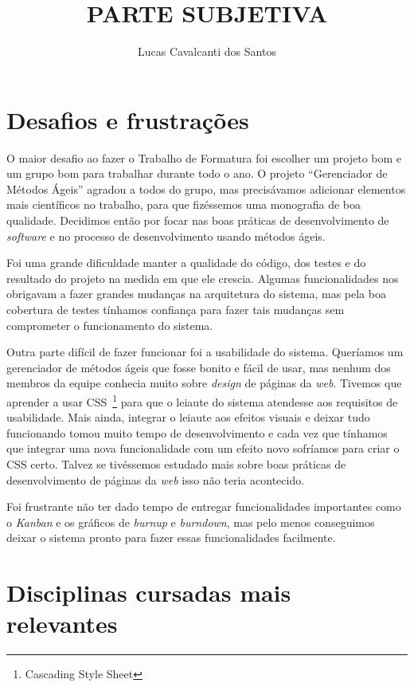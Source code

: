 \documentclass[titlepage,a4paper]{article}
\title{PARTE SUBJETIVA}
\author{Lucas Cavalcanti dos Santos}
\newcommand{\software}{\textit{software}}
\begin{document}
\maketitle



\section{Desafios e frustrações}

O maior desafio ao fazer o Trabalho de Formatura foi escolher um projeto bom e um grupo bom para trabalhar durante todo o ano. O projeto ``Gerenciador de Métodos Ágeis'' agradou a todos do grupo, mas precisávamos adicionar elementos mais científicos no trabalho, para que fizéssemos uma monografia de boa qualidade. Decidimos então por focar nas boas práticas de desenvolvimento de \software{} e no processo de desenvolvimento usando métodos ágeis.

Foi uma grande dificuldade manter a qualidade do código, dos testes e do resultado do projeto na medida em que ele crescia. Algumas funcionalidades nos obrigavam a fazer grandes mudanças na arquitetura do sistema, mas pela boa cobertura de testes tínhamos confiança para fazer tais mudanças sem comprometer o funcionamento do sistema.

Outra parte difícil de fazer funcionar foi a usabilidade do sistema. Queríamos um gerenciador de métodos ágeis que fosse bonito e fácil de usar, mas nenhum dos membros da equipe conhecia muito sobre \textit{design} de páginas da \textit{web}. Tivemos que aprender a usar CSS~\footnote{Cascading Style Sheet} para que o leiaute do sistema atendesse aos requisitos de usabilidade. Mais ainda, integrar o leiaute aos efeitos visuais e deixar tudo funcionando tomou muito tempo de desenvolvimento e cada vez que tínhamos que integrar uma nova funcionalidade com um efeito novo sofríamos para criar o CSS certo. Talvez se tivéssemos estudado mais sobre boas práticas de desenvolvimento de páginas da \textit{web} isso não teria acontecido.

Foi frustrante não ter dado tempo de entregar funcionalidades importantes como o \textit{Kanban} e os gráficos de \textit{burnup} e \textit{burndown}, mas pelo menos conseguimos deixar o sistema pronto para fazer essas funcionalidades facilmente.

\section{Disciplinas cursadas mais relevantes}
\end{document}
